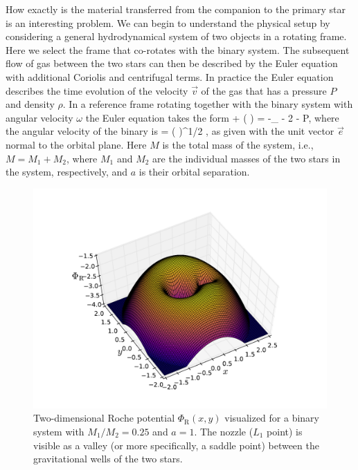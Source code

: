 How exactly is the material transferred from the companion to the primary star is an interesting problem.
We can begin to understand the physical setup by considering a general hydrodynamical system of two objects in a rotating frame.
Here we select the frame that co-rotates with the binary system. %
The subsequent flow of gas between the two stars can then be described by the Euler equation with additional Coriolis and centrifugal terms.\cite[see e.g.,][]{Cho98}
In practice the Euler equation describes the time evolution of the velocity $\vec{v}$ of the gas that has a pressure $P$ and density $\rho$.
In a reference frame rotating together with the binary system with angular velocity $\omega$ the Euler equation takes the form 
\be
{} + ( \cdot \nabla) = -\nabla \Phi_{} - 2 \vec{ \omega } \times {} -  \nabla P,
\ee
where the angular velocity of the binary is
\be
\vec{ \omega } = \left(  \right)^{1/2} ,
\ee
as given with the unit vector $\vec{e}$ normal to the orbital plane.
Here $M$ is the total mass of the system, i.e., $M = M_1 + M_2$, where $M_1$ and $M_2$ are the individual masses of the two stars in the system, respectively, and $a$ is their orbital separation.

\begin{figure}[t!]
\includegraphics[width=16cm]{figs/astro/roche.pdf}
\caption{\label{fig:roche}
    Two-dimensional Roche potential $\Phi_{\mathrm{R}}(x,y)$ visualized for a binary system with $M_1/M_2 = 0.25$ and $a = 1$. 
    The nozzle ($L_1$ point) is visible as a valley (or more specifically, a saddle point) between the gravitational wells of the two stars.
}
\end{figure}

